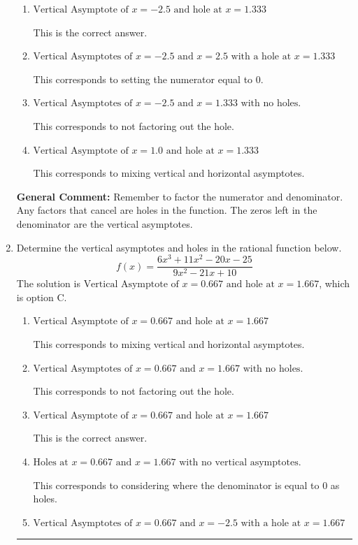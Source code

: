 \documentclass{extbook}[14pt]
\newcommand{\litem}[1]{\item #1

\rule{\textwidth}{0.4pt}}
\begin{document}
\begin{enumerate}
{\begin{enumerate}[label=\Alph*.]
This corresponds to considering where the denominator is equal to 0 as holes.
\item \( \text{Vertical Asymptote of } x = -2.5 \text{ and hole at } x = 1.333 \)

This is the correct answer.
\item \( \text{Vertical Asymptotes of } x = -2.5 \text{ and } x = 2.5 \text{ with a hole at } x = 1.333 \)

This corresponds to setting the numerator equal to 0.
\item \( \text{Vertical Asymptotes of } x = -2.5 \text{ and } x = 1.333 \text{ with no holes.} \)

This corresponds to not factoring out the hole.
\item \( \text{Vertical Asymptote of } x = 1.0 \text{ and hole at } x = 1.333 \)

This corresponds to mixing vertical and horizontal asymptotes.
\end{enumerate}

\textbf{General Comment:} Remember to factor the numerator and denominator. Any factors that cancel are holes in the function. The zeros left in the denominator are the vertical asymptotes.
}
\litem{
Determine the vertical asymptotes and holes in the rational function below.
\[ f(x) = \frac{6x^{3} +11 x^{2} -20 x -25}{9x^{2} -21 x + 10} \]The solution is \( \text{Vertical Asymptote of } x = 0.667 \text{ and hole at } x = 1.667 \), which is option C.\begin{enumerate}[label=\Alph*.]
\item \( \text{Vertical Asymptote of } x = 0.667 \text{ and hole at } x = 1.667 \)

This corresponds to mixing vertical and horizontal asymptotes.
\item \( \text{Vertical Asymptotes of } x = 0.667 \text{ and } x = 1.667 \text{ with no holes.} \)

This corresponds to not factoring out the hole.
\item \( \text{Vertical Asymptote of } x = 0.667 \text{ and hole at } x = 1.667 \)

This is the correct answer.
\item \( \text{Holes at } x = 0.667 \text{ and } x = 1.667 \text{ with no vertical asymptotes.} \)

This corresponds to considering where the denominator is equal to 0 as holes.
\item \( \text{Vertical Asymptotes of } x = 0.667 \text{ and } x = -2.5 \text{ with a hole at } x = 1.667 \)


\end{enumerate}}
\end{enumerate}
\end{document}
